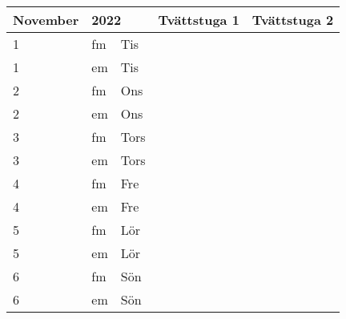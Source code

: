 \documentclass[a4paper]{article}
\begin{document}
\begin{table}[ht!]
\vspace{-10em}%
\normalsize
\begin{tabular}{lllp{7cm}p{7cm}}
\textbf{November}           & \multicolumn{2}{l}{\textbf{2022}}                  & \textbf{Tvättstuga 1} & \textbf{Tvättstuga 2} \\ \hline    

\multicolumn{1}{|l|}{1} & \multicolumn{1}{l|}{fm} & \multicolumn{1}{l|}{Tis} & \multicolumn{1}{l|}{} & \multicolumn{1}{l|}{} \\ \hline
\multicolumn{1}{|l|}{1} & \multicolumn{1}{l|}{em} & \multicolumn{1}{l|}{Tis} & \multicolumn{1}{l|}{} & \multicolumn{1}{l|}{} \\ \hline    

\multicolumn{1}{|l|}{2} & \multicolumn{1}{l|}{fm} & \multicolumn{1}{l|}{Ons} & \multicolumn{1}{l|}{} & \multicolumn{1}{l|}{} \\ \hline
\multicolumn{1}{|l|}{2} & \multicolumn{1}{l|}{em} & \multicolumn{1}{l|}{Ons} & \multicolumn{1}{l|}{} & \multicolumn{1}{l|}{} \\ \hline    

\multicolumn{1}{|l|}{3} & \multicolumn{1}{l|}{fm} & \multicolumn{1}{l|}{Tors} & \multicolumn{1}{l|}{} & \multicolumn{1}{l|}{} \\ \hline
\multicolumn{1}{|l|}{3} & \multicolumn{1}{l|}{em} & \multicolumn{1}{l|}{Tors} & \multicolumn{1}{l|}{} & \multicolumn{1}{l|}{} \\ \hline    

\multicolumn{1}{|l|}{4} & \multicolumn{1}{l|}{fm} & \multicolumn{1}{l|}{Fre} & \multicolumn{1}{l|}{} & \multicolumn{1}{l|}{} \\ \hline
\multicolumn{1}{|l|}{4} & \multicolumn{1}{l|}{em} & \multicolumn{1}{l|}{Fre} & \multicolumn{1}{l|}{} & \multicolumn{1}{l|}{} \\ \hline    

\multicolumn{1}{|l|}{5} & \multicolumn{1}{l|}{fm} & \multicolumn{1}{l|}{Lör} & \multicolumn{1}{l|}{} & \multicolumn{1}{l|}{} \\ \hline
\multicolumn{1}{|l|}{5} & \multicolumn{1}{l|}{em} & \multicolumn{1}{l|}{Lör} & \multicolumn{1}{l|}{} & \multicolumn{1}{l|}{} \\ \hline    

\multicolumn{1}{|l|}{6} & \multicolumn{1}{l|}{fm} & \multicolumn{1}{l|}{Sön} & \multicolumn{1}{l|}{} & \multicolumn{1}{l|}{} \\ \hline
\multicolumn{1}{|l|}{6} & \multicolumn{1}{l|}{em} & \multicolumn{1}{l|}{Sön} & \multicolumn{1}{l|}{} & \multicolumn{1}{l|}{} \\ \hline    


\end{tabular}
\end{table}
\end{document}
